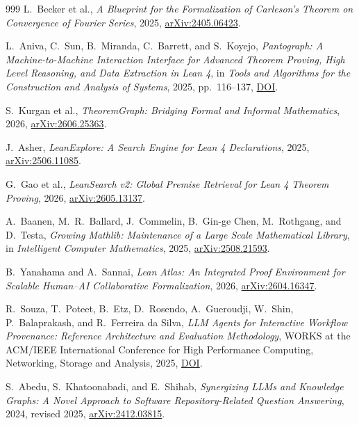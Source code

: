 \documentclass[10pt]{article}
\begin{document}
\begin{thebibliography}{999}
 L.~Becker et al., \emph{A Blueprint for the Formalization
of Carleson's Theorem on Convergence of Fourier Series}, 2025,
\href{https://doi.org/10.48550/arXiv.2405.06423}{arXiv:2405.06423}.

 L.~Aniva, C.~Sun, B.~Miranda, C.~Barrett, and S.~Koyejo,
\emph{Pantograph: A Machine-to-Machine Interaction Interface for Advanced
Theorem Proving, High Level Reasoning, and Data Extraction in Lean 4}, in
\emph{Tools and Algorithms for the Construction and Analysis of Systems},
2025, pp.~116--137,
\href{https://doi.org/10.1007/978-3-031-90643-5_6}{DOI}.

 S.~Kurgan et al., \emph{TheoremGraph: Bridging Formal
and Informal Mathematics}, 2026,
\href{https://doi.org/10.48550/arXiv.2606.25363}{arXiv:2606.25363}.

 J.~Asher, \emph{LeanExplore: A Search Engine for Lean 4
Declarations}, 2025,
\href{https://doi.org/10.48550/arXiv.2506.11085}{arXiv:2506.11085}.

 G.~Gao et al., \emph{LeanSearch v2: Global Premise
Retrieval for Lean 4 Theorem Proving}, 2026,
\href{https://doi.org/10.48550/arXiv.2605.13137}{arXiv:2605.13137}.

 A.~Baanen, M.~R.~Ballard, J.~Commelin,
B.~Gin-ge Chen, M.~Rothgang, and D.~Testa, \emph{Growing Mathlib:
Maintenance of a Large Scale Mathematical Library}, in \emph{Intelligent
Computer Mathematics}, 2025,
\href{https://doi.org/10.48550/arXiv.2508.21593}{arXiv:2508.21593}.

 B.~Yanahama and A.~Sannai, \emph{Lean Atlas: An
Integrated Proof Environment for Scalable Human--AI Collaborative
Formalization}, 2026,
\href{https://doi.org/10.48550/arXiv.2604.16347}{arXiv:2604.16347}.

 R.~Souza, T.~Poteet, B.~Etz, D.~Rosendo,
A.~Gueroudji, W.~Shin, P.~Balaprakash, and R.~Ferreira da Silva,
\emph{LLM Agents for Interactive Workflow Provenance: Reference Architecture
and Evaluation Methodology}, WORKS at the ACM/IEEE International Conference
for High Performance Computing, Networking, Storage and Analysis, 2025,
\href{https://doi.org/10.1145/3731599.3767582}{DOI}.

 S.~Abedu, S.~Khatoonabadi, and E.~Shihab,
\emph{Synergizing LLMs and Knowledge Graphs: A Novel Approach to Software
Repository-Related Question Answering}, 2024, revised 2025,
\href{https://arxiv.org/abs/2412.03815}{arXiv:2412.03815}.


\end{thebibliography}
\end{document}
